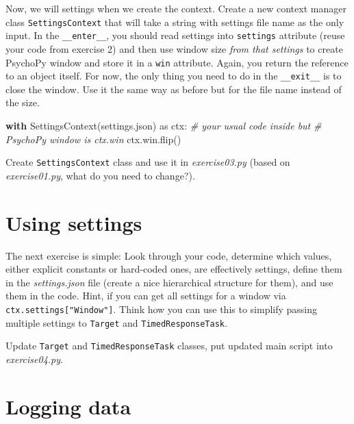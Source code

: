 \documentclass[
]{book}
\newenvironment{Shaded}{\begin{snugshade}}{\end{snugshade}}
\newcommand{\CommentTok}[1]{\textcolor[rgb]{0.56,0.35,0.01}{\textit{#1}}}
\newcommand{\ControlFlowTok}[1]{\textcolor[rgb]{0.13,0.29,0.53}{\textbf{#1}}}
\newcommand{\ImportTok}[1]{#1}
\newcommand{\NormalTok}[1]{#1}
\newcommand{\StringTok}[1]{\textcolor[rgb]{0.31,0.60,0.02}{#1}}
\begin{document}
Now, we will settings when we create the context. Create a new context manager class \texttt{SettingsContext} that will take a string with settings file name as the only input. In the \texttt{\_\_enter\_\_}, you should read settings into \texttt{settings} attribute (reuse your code from exercise 2) and then use window size \emph{from that settings} to create PsychoPy window and store it in a \texttt{win} attribute. Again, you return the reference to an object itself. For now, the only thing you need to do in the \texttt{\_\_exit\_\_} is to close the window. Use it the same way as before but for the file name instead of the size.

\begin{Shaded}
\begin{Highlighting}[]
\ControlFlowTok{with}\NormalTok{ SettingsContext(}\StringTok{\textquotesingle{}settings.json\textquotesingle{}}\NormalTok{) }\ImportTok{as}\NormalTok{ ctx:}
    \CommentTok{\# your usual code inside but}
    \CommentTok{\# PsychoPy window is ctx.win}
\NormalTok{    ctx.win.flip()}
\end{Highlighting}
\end{Shaded}

Create \texttt{SettingsContext} class and use it in \emph{exercise03.py} (based on \emph{exercise01.py}, what do you need to change?).

\hypertarget{using-settings}{%
\section{Using settings}\label{using-settings}}

The next exercise is simple: Look through your code, determine which values, either explicit constants or hard-coded ones, are effectively settings, define them in the \emph{settings.json} file (create a nice hierarchical structure for them), and use them in the code. Hint, if you can get all settings for a window via \texttt{ctx.settings{[}"Window"{]}}. Think how you can use this to simplify passing multiple settings to \texttt{Target} and \texttt{TimedResponseTask}.

Update \texttt{Target} and \texttt{TimedResponseTask} classes, put updated main script into \emph{exercise04.py}.

\hypertarget{logging-data-1}{%
\section{Logging data}\label{logging-data-1}}
\end{document}
